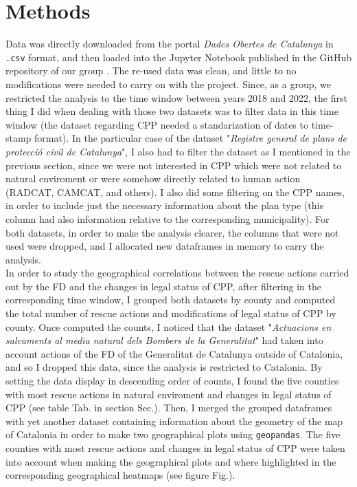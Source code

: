 \documentclass[
  journal=small,
  manuscript=mini-article,  %
  year=2023,
  volume=1,
]{odj-journal}
\begin{document}
\section{Methods}\label{sec:methods}
Data was directly downloaded from the portal \textit{Dades Obertes de Catalunya} in \texttt{.csv} format, and then loaded into the Jupyter Notebook published in the GitHub repository of our group \cite{github_repo}. The re-used data was clean, and little to no modifications were needed to carry on with the project. Since, as a group, we restricted the analysis to the time window between years 2018 and 2022, the first thing I did when dealing with those two datasets was to filter data in this time window (the dataset regarding CPP needed a standarization of dates to time-stamp format). In the particular case of the dataset "\textit{Registre general de plans de protecció civil de Catalunya}", I also had to filter the dataset as I mentioned in the previous section, since we were not interested in CPP which were not related to natural enviroment or were somehow directly related to human action (RADCAT, CAMCAT, and others). I also did some filtering on the CPP names, in order to include just the necessary information about the plan type (this column had also information relative to the corresponding municipality). For both datasets, in order to make the analysis clearer, the columns that were not used were dropped, and I allocated new dataframes in memory to carry the analysis.\\

In order to study the geographical correlations between the rescue actions carried out by the FD and the changes in legal status of CPP, after filtering in the corresponding time window, I grouped both datasets by county and computed the total number of rescue actions and modifications of legal status of CPP by county. Once computed the counts, I noticed that the dataset "\textit{Actuacions en salvaments al media natural dels Bombers de la Generalitat}" had taken into account actions of the FD of the Generalitat de Catalunya outside of Catalonia, and so I dropped this data, since the analysis is restricted to Catalonia. By setting the data display in descending order of counts, I found the five counties with most rescue actions in natural enviroment and changes in legal status of CPP (see table Tab. in section Sec.). Then, I merged the grouped dataframes with yet another dataset containing information about the geometry of the map of Catalonia in order to make two geographical plots using \texttt{geopandas}. The five counties with most rescue actions and changes in legal status of CPP were taken into account when making the geographical plots and where highlighted in the corresponding geographical heatmaps (see figure Fig.).\\
\end{document}

